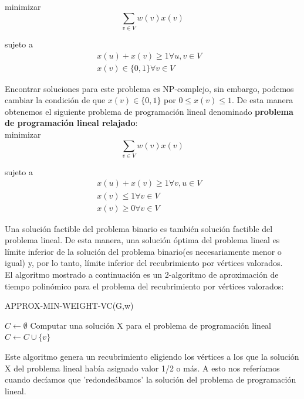 \documentclass{article}
\begin{document}
minimizar	$$
\sum_{v \in V}w(v)x(v)
$$
	
sujeto a
	$$
	\begin{array}{l}
	x(u) + x(v) \geq 1 \forall u, v \in V &\\
	        x(v) \in \{0,1\} \forall v \in V
					\end{array}
	$$	
	

Encontrar soluciones para este problema es NP-complejo, sin embargo, podemos cambiar la condición de que $x(v) \in \{0,1\}$ por $0 \leq x(v) \leq 1$. De esta manera obtenemos el siguiente problema de programación lineal denominado \textbf{problema de programación lineal relajado}:\\

minimizar	$$
\sum_{v \in V}w(v)x(v)
$$
	
sujeto a
	$$
	\begin{array}{l}
	x(u) + x(v) \geq 1 \forall v, u \in V &\\
	        x(v) \leq 1 \forall v \in V &\\
					x(v) \geq 0 \forall v \in V
					\end{array}
	$$	
		
		
			
Una solución factible del problema binario es también solución factible del problema lineal. De esta manera, una solución óptima del problema lineal es límite inferior de la solución del problema binario(es necesariamente menor o igual) y, por lo tanto, límite inferior del recubrimiento por vértices valorados.\\

El algoritmo mostrado a continuación es un 2-algoritmo de aproximación de tiempo polinómico para el problema del recubrimiento por vértices valorados:\\

\begin{algorithm}[H]
\caption{APPROX-MIN-WEIGHT-VC(G,w)}
\begin{algorithmic}[1]
\STATE $C \gets \emptyset$
\STATE Computar una solución X para el problema de programación lineal
\STATE $C \gets C \cup \{v\}$
\ENDIF
\ENDFOR
{}
\end{algorithmic}
\end{algorithm}

Este algoritmo genera un recubrimiento eligiendo los vértices a los que la solución X del problema lineal había asignado valor 1/2 o más. A esto nos referíamos cuando decíamos que 'redondeábamos' la solución del problema de programación lineal.\\
\end{document}
